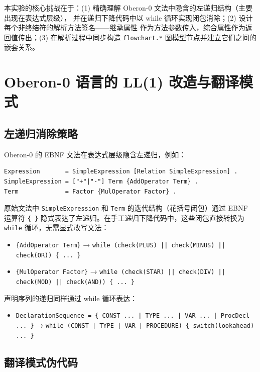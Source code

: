 \documentclass[a4paper]{article}
\begin{document}
本实验的核心挑战在于：(1) 精确理解 Oberon-0 文法中隐含的左递归结构（主要出现在表达式层级），
并在递归下降代码中以 while 循环实现闭包消除；(2) 设计每个非终结符的解析方法签名——继承属性
作为方法参数传入，综合属性作为返回值传出；(3) 在解析过程中同步构造 \texttt{flowchart.*}
图模型节点并建立它们之间的嵌套关系。

\section{Oberon-0 语言的 LL(1) 改造与翻译模式}

\subsection{左递归消除策略}

Oberon-0 的 EBNF 文法在表达式层级隐含左递归，例如：

\begin{verbatim}
Expression       = SimpleExpression [Relation SimpleExpression] .
SimpleExpression = ["+"|"-"] Term {AddOperator Term} .
Term             = Factor {MulOperator Factor} .
\end{verbatim}

原始文法中 \texttt{SimpleExpression} 和 \texttt{Term} 的迭代结构（花括号闭包）通过 EBNF
运算符 \texttt{\{\ \}} 隐式表达了左递归。在手工递归下降代码中，这些闭包直接转换为 \texttt{while}
循环，无需显式改写文法：

\begin{itemize}
    \item \texttt{\{AddOperator Term\}} → \texttt{while (check(PLUS) || check(MINUS) || check(OR)) \{ ... \}}
    \item \texttt{\{MulOperator Factor\}} → \texttt{while (check(STAR) || check(DIV) || check(MOD) || check(AND)) \{ ... \}}
\end{itemize}

声明序列的递归同样通过 while 循环表达：

\begin{itemize}
    \item \texttt{DeclarationSequence = \{ CONST ... | TYPE ... | VAR ... | ProcDecl ... \}}
          → \texttt{while (CONST | TYPE | VAR | PROCEDURE) \{ switch(lookahead) ... \}}
\end{itemize}

\subsection{翻译模式伪代码}
\end{document}
